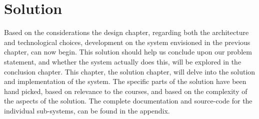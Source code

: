 \chapter{Solution}

Based on the considerations the design chapter, regarding both the architecture and technological choices, development on the system envisioned in the previous chapter, can now begin.
This solution should help us conclude upon our problem statement, and whether the system actually does this, will be explored in the conclusion chapter.
This chapter, the solution chapter, will delve into the solution and implementation of the system.
The specific parts of the solution have been hand picked, based on relevance to the courses, and based on the complexity of the aspects of the solution.
The complete documentation and source-code for the individual sub-systems, can be found in the appendix.
